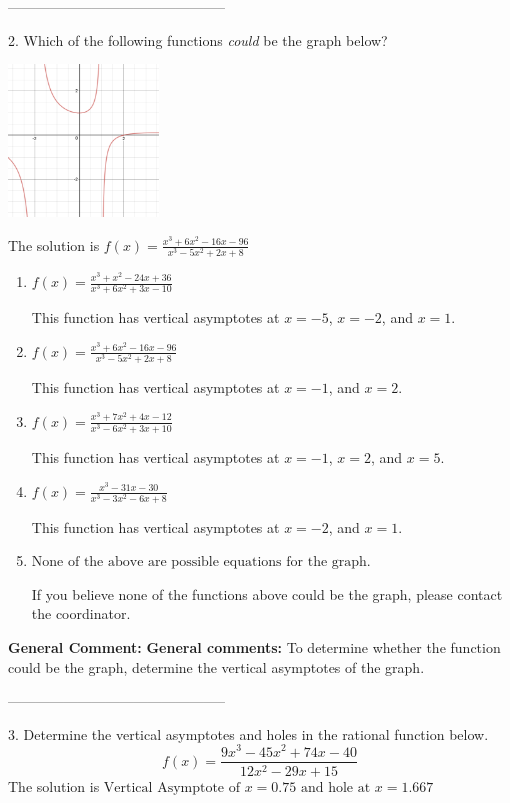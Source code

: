 \documentclass{extbook}[14pt]
\begin{document}
-----------------------------------------------

2. Which of the following functions \textit{could} be the graph below?
\begin{center} \includegraphics[width=0.3\textwidth]{../Figures/identifyGraphOfRationalFunctionB.png} \end{center} 

The solution is $ f(x) = \frac{x^{3} +6 x^{2} -16 x -96}{x^{3} -5 x^{2} +2 x + 8} $ 

\begin{enumerate}[label=\Alph*.] 
\item $ f(x) = \frac{x^{3} + x^{2} -24 x + 36}{x^{3} +6 x^{2} +3 x -10} $ 

 This function has vertical asymptotes at $x=-5$, $x=-2$, and $x=1$. 
\item $ f(x) = \frac{x^{3} +6 x^{2} -16 x -96}{x^{3} -5 x^{2} +2 x + 8} $ 

 This function has vertical asymptotes at $x=-1$, and $x=2$. 
\item $ f(x) = \frac{x^{3} +7 x^{2} +4 x -12}{x^{3} -6 x^{2} +3 x + 10} $ 

 This function has vertical asymptotes at $x=-1$, $x=2$, and $x=5$. 
\item $ f(x) = \frac{x^{3} -31 x -30}{x^{3} -3 x^{2} -6 x + 8} $ 

 This function has vertical asymptotes at $x=-2$, and $x=1$. 
\item $ \text{None of the above are possible equations for the graph.} $ 

 If you believe none of the functions above could be the graph, please contact the coordinator. 
\end{enumerate} 
 
\textbf{General Comment:} \textbf{General comments:} To determine whether the function could be the graph, determine the vertical asymptotes of the graph. 

-----------------------------------------------

3. Determine the vertical asymptotes and holes in the rational function below.
\[ f(x) = \frac{9x^{3} -45 x^{2} +74 x -40}{12x^{2} -29 x + 15} \] 
The solution is $ \text{Vertical Asymptote of } x = 0.75 \text{ and hole at } x = 1.667 $ 
\end{document}
